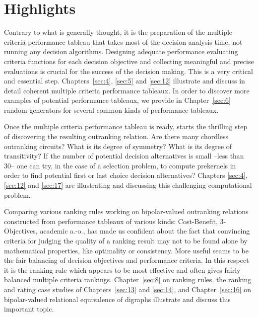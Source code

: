 {}
\section*{Highlights}
\label{sec:0.3}

Contrary to what is generally thought, it is the preparation of the multiple criteria performance tableau that takes most of the decision analysis time, not running any decision algorithms. Designing adequate performance evaluating criteria functions for each decision objective and collecting meaningful and precise evaluations is crucial for the success of the decision making. This is a very critical and essential step. Chapters~\ref{sec:4}, \ref{sec:5} and \ref{sec:12} illustrate and discuss in detail coherent multiple criteria performance tableaux. In order to discover more examples of potential performance tableaux, we provide in Chapter~\ref{sec:6} random generators for several common kinds of performance tableaux. 

Once the multiple criteria performance tableau is ready, starts the thrilling step of discovering the resulting outranking relation. Are there many chordless outranking circuits? What is its degree of symmetry? What is its degree of transitivity?  If the number of potential decision alternatives is small --less than 30-- one can try, in the case of a selection problem, to compute prekernels in order to find potential first or last choice decision alternatives? Chapters \ref{sec:4}, \ref{sec:12} and \ref{sec:17} are illustrating and discussing this challenging computational problem.

Comparing various ranking rules working on bipolar-valued outranking relations constructed from performance tableaux of various kinds: Cost-Benefit, 3-Objectives, academic a.-o., has made us confident about the fact that convincing criteria for judging the quality of a ranking result may not to be found alone by mathematical properties, like \Kemeny optimality or \Condorcet consistency. More useful seams to be the fair balancing of decision objectives and performance criteria. In this respect it is the \NetFlows ranking rule which appears to be most effective and often gives fairly balanced multiple criteria rankings. Chapter~\ref{sec:8} on ranking rules, the ranking and rating case studies of Chapters~\ref{sec:13} and \ref{sec:14}, and Chapter~\ref{sec:16} on bipolar-valued relational equivalence of digraphs illustrate and discuss this important topic.

